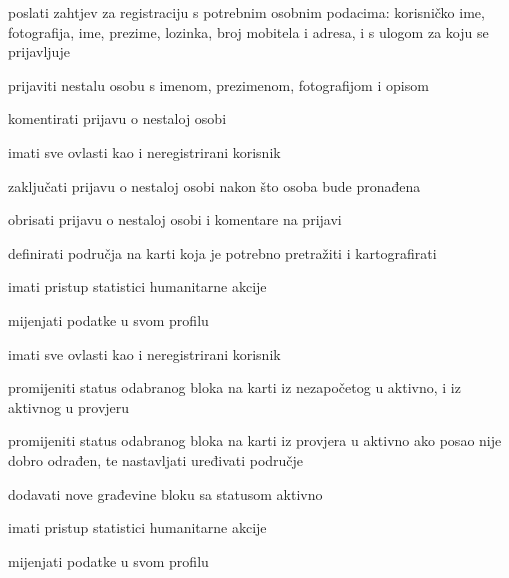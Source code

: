 			
			\begin{packed_enum}
				\item  {}
				
				\begin{packed_enum}
					
					\item poslati zahtjev za registraciju s potrebnim osobnim podacima: korisničko ime, fotografija, ime, prezime, lozinka, broj mobitela i adresa, i s ulogom za koju se prijavljuje
					\item prijaviti nestalu osobu s imenom, prezimenom, fotografijom i opisom
                         \item komentirati prijavu o nestaloj osobi
                        

					
					
				\end{packed_enum}
			
				\item  {}
				
				\begin{packed_enum}

                        \item imati sve ovlasti kao i neregistrirani korisnik
					\item zaključati prijavu o nestaloj osobi nakon što osoba bude pronađena
					\item obrisati prijavu o nestaloj osobi i komentare na prijavi
					\item definirati područja na karti koja je potrebno pretražiti i kartografirati
					\item imati pristup statistici humanitarne akcije
					\item mijenjati podatke u svom profilu
                       

					
				\end{packed_enum}
				
				\item  {}
				
				\begin{packed_enum}
    
					\item imati sve ovlasti kao i neregistrirani korisnik
					\item promijeniti status odabranog bloka na karti iz nezapočetog u aktivno, i iz aktivnog u provjeru
					\item promijeniti status odabranog bloka na karti iz provjera u aktivno ako posao nije dobro odrađen, te nastavljati uređivati područje
					\item dodavati nove građevine bloku sa statusom aktivno
					\item imati pristup statistici humanitarne akcije
					\item mijenjati podatke u svom profilu



\end{packed_enum}
\end{packed_enum}
